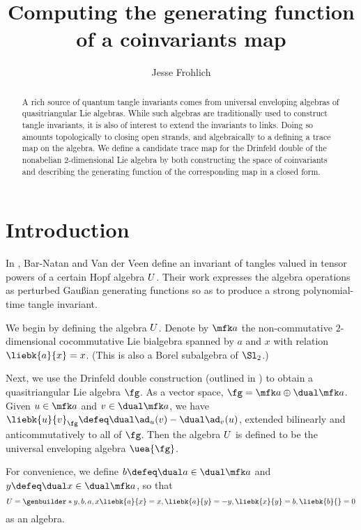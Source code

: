 \documentclass{article}
\title{Computing the generating function of a coinvariants map}
\author{Jesse Frohlich}
\begin{document}
\maketitle

\begin{abstract}
        A rich source of quantum tangle invariants comes from universal
        enveloping algebras of quasitriangular Lie algebras. While such
        algebras are traditionally used to construct tangle invariants, it is
        also of interest to extend the invariants to links. Doing so amounts
        topologically to closing open strands, and algebraically to a defining a
        trace map on the algebra. We define a candidate trace map for the
        Drinfeld double of the nonabelian 2-dimensional Lie algebra by both
        constructing the space of coinvariants and describing the generating
        function of the corresponding map in a closed form.
\end{abstract}

\section{Introduction}

In \cite{BV}, Bar-Natan and Van der Veen define an invariant of tangles valued
in tensor powers of a certain Hopf algebra $U$. Their work expresses the
algebra operations as perturbed Gaußian generating functions so as to produce a
strong polynomial-time tangle invariant.

We begin by defining the algebra $U$. Denote by $\fa$ the non-commutative
$2$-dimensional cocommutative Lie bialgebra spanned by $a$ and $x$ with relation
$\liebk{a}{x} = x$. (This is also a Borel subalgebra of $\Sl_2$.)

Next, we use the Drinfeld double construction (outlined in \cite{ES}) to obtain
a quasitriangular Lie algebra $\fg$. As a vector space,
$\fg = \fa \oplus \dual\fa$. Given $u \in \fa$ and $v\in \dual \fa$, we have
$\liebk{u}{v}_{\fg} \defeq \dual\ad_u(v) - \dual\ad_v(u)$, extended bilinearly
and anticommutatively to all of $\fg$.
Then the algebra $U$ is defined to be the universal enveloping algebra
$\uea{\fg}$.

\begin{remark}
        For convenience, we define $b \defeq \dual a \in \dual\fa$ and
        $y \defeq \dual x \in \dual\fa$, so that
        \begin{equation}
                U = \genbuilder*{y, b, a, x}{
                        \liebk{a}{x} = x,
                        \liebk{a}{y} = -y,
                        \liebk{x}{y} = b,
                        \liebk{b}{ } = 0
                }
        \end{equation}
        as an algebra.
\end{remark}
\end{document}
